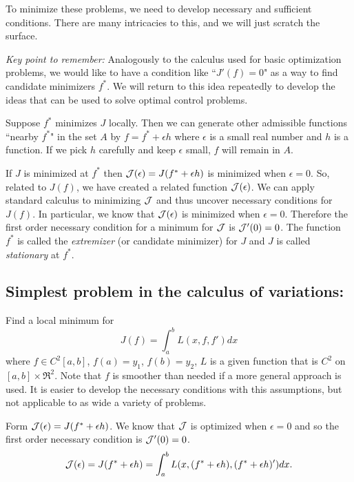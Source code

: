 To minimize these problems, we need to develop necessary and sufficient conditions. There are many intricacies to this, and we will just scratch the surface. 

{\it Key point to remember:} Analogously to the calculus used for basic optimization problems, we would like to have a condition like ``$J'(f)=0$" as a way to find candidate minimizers $f^*$.  We will return to this idea repeatedly to develop the ideas that can be used to solve optimal control problems.

\medskip

Suppose $f^*$ minimizes $J$ locally. Then we can generate other admissible functions ``nearby $f^*$" in the set $A$ by $f = f^* + \epsilon h$ where $\epsilon$ is a small real number and $h$ is a function. If we pick $h$ carefully and keep $\epsilon$ small, $f$ will remain in $A$.

 If $J$ is minimized at $f^*$ then ${\cal J}(\epsilon)=J(f^* +\epsilon h)$ is minimized when $\epsilon = 0$. So, related to $J(f)$, we have created a related function $\cal J(\epsilon)$. We can apply standard calculus to minimizing $\cal J$ and thus uncover necessary conditions for $J(f)$. In particular, we know that ${\cal J}(\epsilon)$ is minimized when $\epsilon = 0$.  Therefore the first order necessary condition for a minimum for $\cal J$ is ${\cal J}'(0) = 0$.  The function $f^*$ is called the {\it extremizer} (or candidate minimizer) for $J$ and $J$ is called {\it stationary} at $f^*$.
 
\subsection{\bf Simplest problem in the calculus of variations:}
 Find a local minimum for $$J(f) = \int_a^b L(x,f,f')dx$$ where $f\in C^2[a,b]$, $f(a) = y_1$, $f(b) = y_2$, $L$ is a given function that is $C^2$ on $[a,b]\times \Re^2$. Note that $f$ is smoother than needed if a more general approach is used. It is easier to develop the necessary conditions with this assumptions, but not applicable to as wide a variety of problems.
 
 Form ${\cal J}(\epsilon) = J(f^* + \epsilon h)$. We know that $\cal J$ is optimized when $\epsilon=0$ and so the first order necessary condition is ${\cal J}'(0) = 0$. 
 $${\cal J}(\epsilon) = J(f^* + \epsilon h) = \int_a^b L(x, (f^*+\epsilon h), ( f^*+\epsilon h)') dx.$$ 
 
